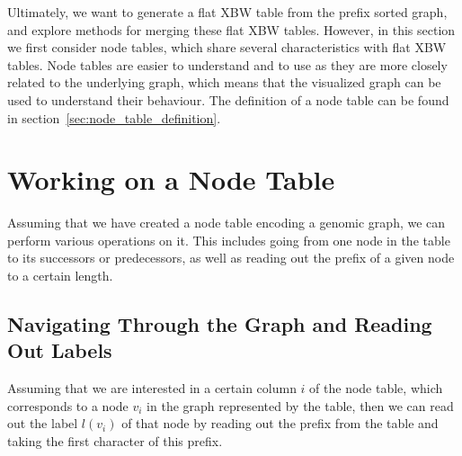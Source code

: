 \documentclass[a4paper,12pt,twoside,BCOR=10mm]{scrbook}
\begin{document}
Ultimately, we want to generate a flat XBW table from the prefix sorted graph, 
and explore methods for merging these flat XBW tables. 
However, in this section we first consider node tables, which share several characteristics 
with flat XBW tables. 
Node tables are easier to understand and to use as they are more closely related to the 
underlying graph, which means that the visualized graph can be used to understand their behaviour. 
The definition of a node table can be found in section~\ref{sec:node_table_definition}.

%

\section{Working on a Node Table}
%

Assuming that we have created a node table encoding a genomic graph, 
we can perform various operations on it. 
This includes going from one node in the table to its successors or predecessors, 
as well as reading out the prefix of a given node to a certain length.

\subsection{Navigating Through the Graph and Reading Out Labels}

Assuming that we are interested in a certain column $ i $ of the node table, 
which corresponds to a node $ v_i $ in the graph represented by the table, 
then we can read out the label $ l ( v_i ) $ of that node by reading out the prefix 
from the table and taking the first character of this prefix.
\end{document}
